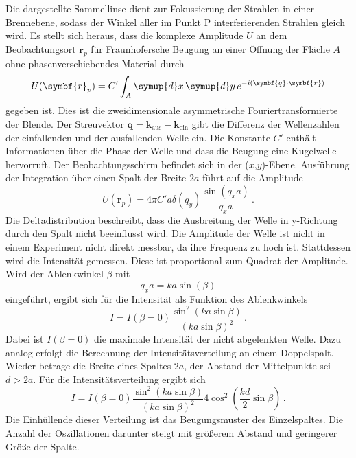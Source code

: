 Die dargestellte Sammellinse dient zur Fokussierung der Strahlen in einer Brennebene,
sodass der Winkel aller im Punkt P interferierenden Strahlen gleich wird.
Es stellt sich heraus, dass die komplexe Amplitude $U$ an dem Beobachtungsort
$\symbf{r}_p$ für Fraunhofersche Beugung an einer Öffnung der Fläche $A$
ohne phasenverschiebendes Material durch
\begin{equation}
  U(\symbf{r}_p) = C' \int_{A} \symup{d}x \, \symup{d}y \, e^{-i(\symbf{q} \cdot \symbf{r})}
  \label{eqn:beugungsintegral}
\end{equation}
gegeben ist. Dies ist die zweidimensionale asymmetrische Fouriertransformierte der
Blende. Der Streuvektor $\symbf{q} = {\symbf{k}}_\text{aus} - {\symbf{k}}_\text{ein}$
gibt die Differenz der Wellenzahlen der einfallenden und der ausfallenden Welle ein.
Die Konstante $C'$ enthält Informationen über die Phase der Welle und dass die Beugung
eine Kugelwelle hervorruft. Der Beobachtungsschirm befindet sich in der ($x$,$y$)-Ebene.
Ausführung der Integration über einen Spalt der Breite $2a$ führt auf die Amplitude
\begin{equation}
  U(\symbf{r}_p) = 4 \pi C' a \delta(q_y) \frac{\sin(q_x a)}{q_x a}\,.
\end{equation}
Die Deltadistribution beschreibt, dass die Ausbreitung der Welle in y-Richtung durch den
Spalt nicht beeinflusst wird. Die Amplitude der Welle ist nicht in einem Experiment nicht
direkt messbar, da ihre Frequenz zu hoch ist. Stattdessen wird die Intensität gemessen.
Diese ist proportional zum Quadrat der Amplitude. Wird der Ablenkwinkel $\beta$ mit
\begin{equation*}
  q_x a = k a \sin(\beta)
\end{equation*}
eingeführt, ergibt sich für die Intensität als Funktion des Ablenkwinkels
\begin{equation}
  I = I(\beta = 0) \frac{\sin^2(k a \sin \beta)}{(k a \sin \beta)^2}\,.
\end{equation}
Dabei ist $I(\beta = 0)$ die maximale Intensität der nicht abgelenkten Welle.
Dazu analog erfolgt die Berechnung der Intensitätsverteilung an einem Doppelspalt.
Wieder betrage die Breite eines Spaltes $2a$, der Abstand der Mittelpunkte sei
$d > 2a$. Für die Intensitätsverteilung ergibt sich
\begin{equation}
  I = I(\beta = 0) \frac{\sin^2(k a \sin \beta)}{(k a \sin \beta )^2} 4 \cos^2 \left (\frac{k d}{2} \sin \beta \right)\,.
\end{equation}
Die Einhüllende dieser Verteilung ist das Beugungsmuster des Einzelspaltes. Die Anzahl
der Oszillationen darunter steigt mit größerem Abstand und geringerer Größe der Spalte.
